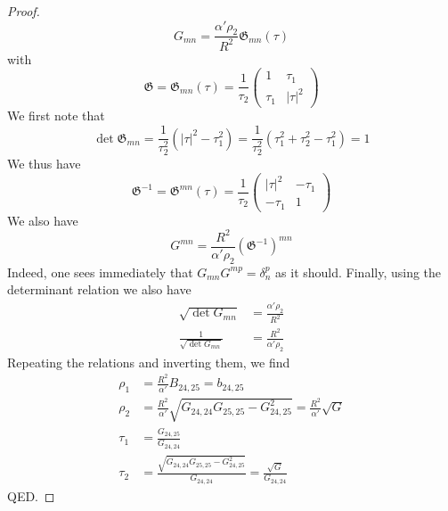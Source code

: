 \begin{tcolorbox}[breakable]
\begin{proof}
		\begin{equation}
			G_{mn} = \frac{\alpha' \rho_2}{R^2} \mathfrak{G}_{mn}(\tau)
		\end{equation}
		with
		\begin{equation}
			\mathfrak{G} = \mathfrak{G}_{mn}(\tau) = \frac{1}{\tau_2} 
			\begin{pmatrix} 
				1 & \tau_1 \\ 
				\tau_1 & |\tau|^2 
			\end{pmatrix}
		\end{equation}
		We first note that
		\begin{equation}
			\det \mathfrak{G}_{mn} = \frac{1}{\tau_2^2} (|\tau|^2 - \tau_1^2) = \frac{1}{\tau_2^2} (\tau_1^2 + \tau_2^2 - \tau_1^2) = 1
		\end{equation}
		We thus have
		\begin{equation}
			\mathfrak{G}^{-1} = \mathfrak{G}^{mn}(\tau) = \frac{1}{\tau_2} 
			\begin{pmatrix} 
				|\tau|^2 & -\tau_1 \\ 
				-\tau_1 & 1 
			\end{pmatrix}
		\end{equation}
		We also have
		\begin{equation}
			G^{mn} = \frac{R^2}{\alpha' \rho_2} (\mathfrak{G}^{-1})^{mn}
		\end{equation}
		Indeed, one sees immediately that $G_{mn}G^{mp} = \delta_n^p$ as it should. Finally, using the determinant relation we also have
		\begin{equation}
			\begin{aligned}
				\sqrt{\det G_{mn}} &= \frac{\alpha' \rho_2}{R^2} \\
				\frac{1}{\sqrt{\det G_{mn}}} &= \frac{R^2}{\alpha' \rho_2}
			\end{aligned}
		\end{equation}
		Repeating the relations and inverting them, we find
		\begin{equation}
			\begin{aligned}
				\rho_1 &= \frac{R^2}{\alpha'} B_{24,25} = b_{24,25} \\
				\rho_2 &= \frac{R^2}{\alpha'} \sqrt{G_{24,24}G_{25,25} - G_{24,25}^2} = \frac{R^2}{\alpha'} \sqrt{G} \\
				\tau_1 &= \frac{G_{24,25}}{G_{24,24}} \\
				\tau_2 &= \frac{\sqrt{G_{24,24}G_{25,25} - G_{24,25}^2}}{G_{24,24}} = \frac{\sqrt{G}}{G_{24,24}}
			\end{aligned}
		\end{equation}
		QED.
	\end{proof}
\end{tcolorbox}
